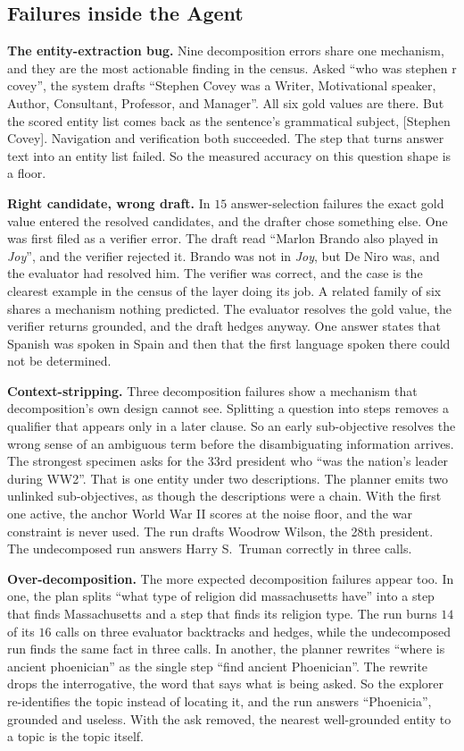 \subsection{Failures inside the Agent}

\textbf{The entity-extraction bug.} Nine decomposition errors share one
mechanism, and they are the most actionable finding in the census. Asked ``who
was stephen r covey'', the system drafts ``Stephen Covey was a Writer,
Motivational speaker, Author, Consultant, Professor, and Manager''. All six gold
values are there. But the scored entity list comes back as the sentence's
grammatical subject, \textsf{[Stephen Covey]}. Navigation and verification both
succeeded. The step that turns answer text into an entity list failed. So the
measured accuracy on this question shape is a floor.

\textbf{Right candidate, wrong draft.} In $15$ answer-selection failures the
exact gold value entered the resolved candidates, and the drafter chose
something else. One was first filed as a verifier error. The draft read ``Marlon
Brando also played in \emph{Joy}'', and the verifier rejected it. Brando was not
in \emph{Joy}, but De Niro was, and the evaluator had resolved him. The verifier
was correct, and the case is the clearest example in the census of the layer
doing its job. A related family of six shares a mechanism nothing predicted. The
evaluator resolves the gold value, the verifier returns \textsf{grounded}, and
the draft hedges anyway. One answer states that Spanish was spoken in Spain and
then that the first language spoken there could not be determined.

\textbf{Context-stripping.} Three decomposition failures show a mechanism that
decomposition's own design cannot see. Splitting a question into steps removes a
qualifier that appears only in a later clause. So an early sub-objective
resolves the wrong sense of an ambiguous term before the disambiguating
information arrives. The strongest specimen asks for the 33rd president who
``was the nation's leader during WW2''. That is one entity under two
descriptions. The planner emits two unlinked sub-objectives, as though the
descriptions were a chain. With the first one active, the anchor \textsf{World
War II} scores at the noise floor, and the war constraint is never used. The run
drafts Woodrow Wilson, the 28th president. The undecomposed run answers Harry
S.~Truman correctly in three calls.

\textbf{Over-decomposition.} The more expected decomposition failures appear
too. In one, the plan splits ``what type of religion did massachusetts have''
into a step that finds Massachusetts and a step that finds its religion type.
The run burns $14$ of its $16$ calls on three evaluator backtracks and hedges,
while the undecomposed run finds the same fact in three calls. In another, the
planner rewrites ``where is ancient phoenician'' as the single step ``find
ancient Phoenician''. The rewrite drops the interrogative, the word that says
what is being asked. So the explorer re-identifies the topic instead of locating
it, and the run answers ``Phoenicia'', grounded and useless. With the ask
removed, the nearest well-grounded entity to a topic is the topic itself.

